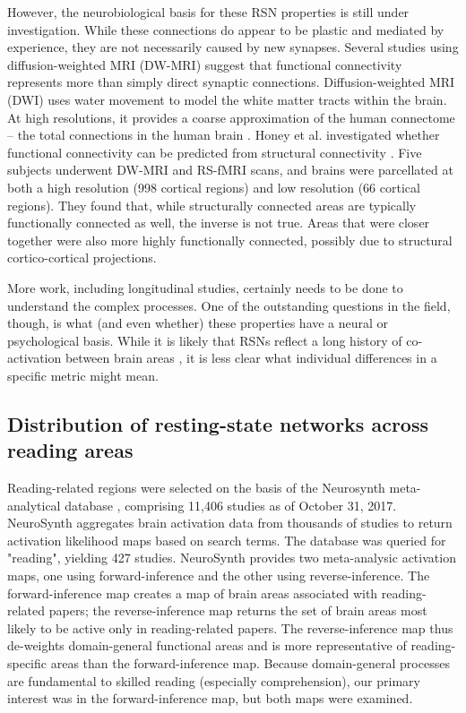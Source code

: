 However, the neurobiological basis for these RSN properties is still under investigation. While these connections do appear to be plastic and mediated by experience, they are not necessarily caused by new synapses. Several studies using diffusion-weighted MRI (DW-MRI) suggest that functional connectivity represents more than simply direct synaptic connections. Diffusion-weighted MRI (DWI) uses water movement to model the white matter tracts within the brain. At high resolutions, it provides a coarse approximation of the human connectome -- the total connections in the human brain \cite{Sporns2005}. Honey et al. investigated whether functional connectivity can be predicted from structural connectivity \cite{Honey2009}. Five subjects underwent DW-MRI and RS-fMRI scans, and brains were parcellated at both a high resolution (998 cortical regions) and low resolution (66 cortical regions). They found that, while structurally connected areas are typically functionally connected as well, the inverse is not true. Areas that were closer together were also more highly functionally connected, possibly due to structural cortico-cortical projections. 

More work, including longitudinal studies, certainly needs to be done to understand the complex processes. One of the outstanding questions in the field, though, is what (and even whether) these properties have a neural or psychological basis. While it is likely that RSNs reflect a long history of co-activation between brain areas \cite{Cohen2008, Fair2008}, it is less clear what individual differences in a specific metric might mean.


\subsection{Distribution of resting-state networks across reading areas}
Reading-related regions were selected on the basis of the Neurosynth meta-analytical database \cite{Yarkoni2011}, comprising 11,406 studies as of October 31, 2017. NeuroSynth aggregates brain activation data from thousands of studies to return activation likelihood maps based on search terms. The database was queried for "reading", yielding 427 studies. NeuroSynth provides two meta-analysic activation maps, one using forward-inference and the other using reverse-inference. The forward-inference map creates a map of brain areas associated with reading-related papers; the reverse-inference map returns the set of brain areas most likely to be active only in reading-related papers. The reverse-inference map thus de-weights domain-general functional areas and is more representative of reading-specific areas than the forward-inference map. Because domain-general processes are fundamental to skilled reading (especially comprehension), our primary interest was in the forward-inference map, but both maps were examined. 

